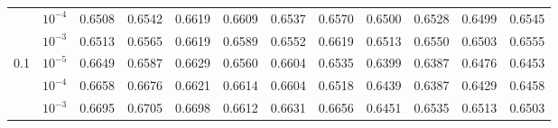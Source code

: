 \documentclass[UTF8,a4paper,11pt]{ctexart}
\begin{document}
\begin{landscape}
\begin{table}[H]
\begin{tabular}{llcccccccccc}
        & $10^{-4}$ & 0.6508 & 0.6542 & 0.6619 & 0.6609 & 0.6537 & 0.6570 & 0.6500 & 0.6528 & 0.6499 & 0.6545 \\
        & $10^{-3}$ & 0.6513 & 0.6565 & 0.6619 & 0.6589 & 0.6552 & 0.6619 & 0.6513 & 0.6550 & 0.6503 & 0.6555 \\
        \midrule
        \multirow{3}{*}{0.1} & $10^{-5}$ & 0.6649 & 0.6587 & 0.6629 & 0.6560 & 0.6604 & 0.6535 & 0.6399 & 0.6387 & 0.6476 & 0.6453 \\
        & $10^{-4}$ & 0.6658 & 0.6676 & 0.6621 & 0.6614 & 0.6604 & 0.6518 & 0.6439 & 0.6387 & 0.6429 & 0.6458 \\
        & $10^{-3}$ & 0.6695 & 0.6705 & 0.6698 & 0.6612 & 0.6631 & 0.6656 & 0.6451 & 0.6535 & 0.6513 & 0.6503 \\
        \bottomrule
    \end{tabular}
\end{table}
\end{landscape}
\end{document}
